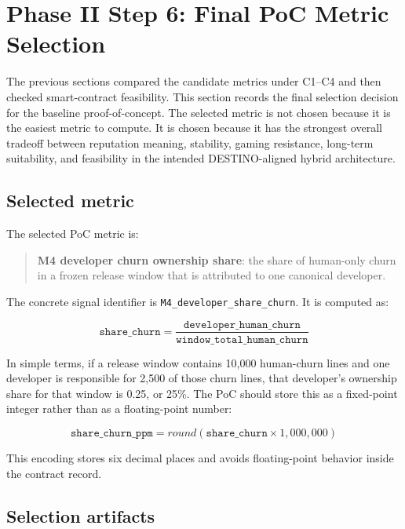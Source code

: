 \section{Phase II Step 6: Final PoC Metric Selection}
\label{sec:phase2_poc_metric_selection}

The previous sections compared the candidate metrics under C1--C4 and then checked smart-contract feasibility.
This section records the final selection decision for the baseline proof-of-concept. The selected metric is not
chosen because it is the easiest metric to compute. It is chosen because it has the strongest overall tradeoff
between reputation meaning, stability, gaming resistance, long-term suitability, and feasibility in the intended
DESTINO-aligned hybrid architecture.

\subsection{Selected metric}
\label{sec:selected_metric_definition}

The selected PoC metric is:

\begin{quote}
\textbf{M4 developer churn ownership share}: the share of human-only churn in a frozen release window that is
attributed to one canonical developer.
\end{quote}

The concrete signal identifier is \texttt{M4\_developer\_share\_churn}. It is computed as:

\[
\texttt{share\_churn} =
\frac{\texttt{developer\_human\_churn}}
{\texttt{window\_total\_human\_churn}}
\]

In simple terms, if a release window contains 10,000 human-churn lines and one developer is responsible for
2,500 of those churn lines, that developer's ownership share for that window is 0.25, or 25\%. The PoC should
store this as a fixed-point integer rather than as a floating-point number:

\[
\texttt{share\_churn\_ppm} = round(\texttt{share\_churn} \times 1{,}000{,}000)
\]

This encoding stores six decimal places and avoids floating-point behavior inside the contract record.

\subsection{Selection artifacts}
\label{sec:poc_selection_artifacts}

